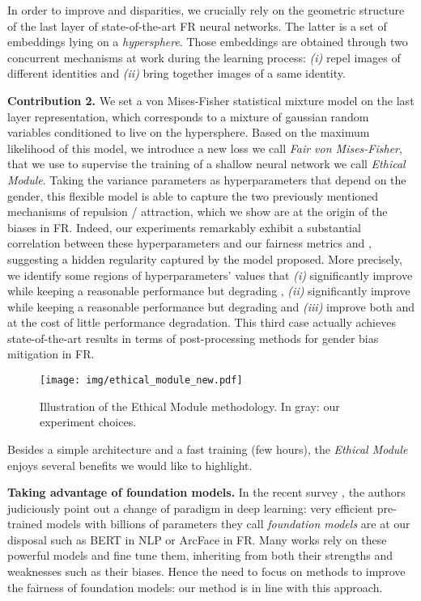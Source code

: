 \documentclass[nohyperref]{article}
\theoremstyle{plain}
\theoremstyle{definition}
\theoremstyle{remark}
\begin{document}
In order to improve  and  disparities, we crucially rely on the geometric structure of the last layer of state-of-the-art FR neural networks. The latter is a set of embeddings lying on a \textit{hypersphere}. Those embeddings are obtained through two concurrent mechanisms at work during the learning process: {\it (i)} repel images of different identities and {\it (ii)} bring together images of a same identity. 

{\bf Contribution 2.} We set a von Mises-Fisher statistical mixture model on the last layer representation, which corresponds to a mixture of gaussian random variables conditioned to live on the hypersphere. Based on the maximum likelihood of this model, we introduce a new loss we call {\it Fair von Mises-Fisher}, that we use to supervise the training of a shallow neural network we call {\it Ethical Module}. Taking the variance parameters as hyperparameters that depend on the gender, this flexible model is able to capture the two previously mentioned mechanisms of repulsion / attraction, which we show are at the origin of the biases in FR. Indeed, our experiments remarkably exhibit a substantial correlation between these hyperparameters and our fairness metrics  and , suggesting a hidden regularity captured by the model proposed. More precisely, we identify some regions of hyperparameters' values that {\it (i)} significantly improve  while keeping a reasonable performance but degrading , {\it (ii)} significantly improve  while keeping a reasonable performance but degrading  and {\it (iii)} improve both  and  at the cost of little performance degradation. This third case actually achieves state-of-the-art results in terms of post-processing methods for gender bias mitigation in FR.






\begin{figure}[h]
    \centering
    \texttt{[image: img/ethical\_module\_new.pdf]}
    \caption{Illustration of the Ethical Module methodology. In gray: our experiment choices.
}
    \label{fig:ethical_module}
\end{figure}

Besides a simple architecture and a fast training (few hours), the {\it Ethical Module} enjoys several benefits we would like to highlight. 

{\bf Taking advantage of foundation models.} In the recent survey \cite{bommasani2021opportunities}, the authors judiciously point out a change of paradigm in deep learning: very efficient pre-trained models with billions of parameters they call {\it foundation models} are at our disposal such as BERT \cite{devlin2018bert} in NLP or ArcFace \cite{arcface} in FR. Many works rely on these powerful models and fine tune them, inheriting from both their strengths and weaknesses such as their biases. Hence the need to focus on methods to improve the fairness of foundation models: our method is in line with this approach.
\end{document}
